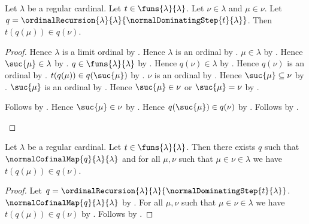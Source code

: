 \begin{theorem}\label{normal_dominating_recursion_later}
    Let $\lambda$ be a regular cardinal.
    Let $t\in\funs{\lambda}{\lambda}$.
    Let $\nu\in\lambda$ and $\mu\in\nu$.
    Let $q=\ordinalRecursion{\lambda}{\lambda}
        {\normalDominatingStep{t}{\lambda}}$.
    Then $t(q(\mu))\in q(\nu)$.
\end{theorem}
\begin{proof}
    Hence $\lambda$ is a limit ordinal by
        .
    Hence $\lambda$ is an ordinal by .
    $\mu\in\lambda$ by .
    Hence $\suc{\mu}\in\lambda$ by .
    $q\in\funs{\lambda}{\lambda}$ by
        .
    Hence $q(\nu)\in\lambda$ by .
    Hence $q(\nu)$ is an ordinal by
        .
    $t(q(\mu))\in q(\suc{\mu})$ by
        .
    $\nu$ is an ordinal by .
    Hence $\suc{\mu}\subseteq\nu$ by .
    $\suc{\mu}$ is an ordinal by .
    Hence $\suc{\mu}\in\nu$ or $\suc{\mu}=\nu$ by
        .
    \begin{byCase}
            Follows by \auto.
            Hence $\suc{\mu}\in\nu$ by \auto.
            Hence $q(\suc{\mu})\in q(\nu)$ by
                .
            Follows by .
    \end{byCase}
\end{proof}

\begin{theorem}\label{normal_dominating_map}
    Let $\lambda$ be a regular cardinal.
    Let $t\in\funs{\lambda}{\lambda}$.
    Then there exists $q$ such that
        $\normalCofinalMap{q}{\lambda}{\lambda}$ and
        for all $\mu,\nu$ such that $\mu\in\nu\in\lambda$ we have
            $t(q(\mu))\in q(\nu)$.
\end{theorem}
\begin{proof}
    Let $q=\ordinalRecursion{\lambda}{\lambda}
        {\normalDominatingStep{t}{\lambda}}$.
    $\normalCofinalMap{q}{\lambda}{\lambda}$ by
        .
    For all $\mu,\nu$ such that $\mu\in\nu\in\lambda$ we have
        $t(q(\mu))\in q(\nu)$ by
        .
    Follows by \auto.
\end{proof}
